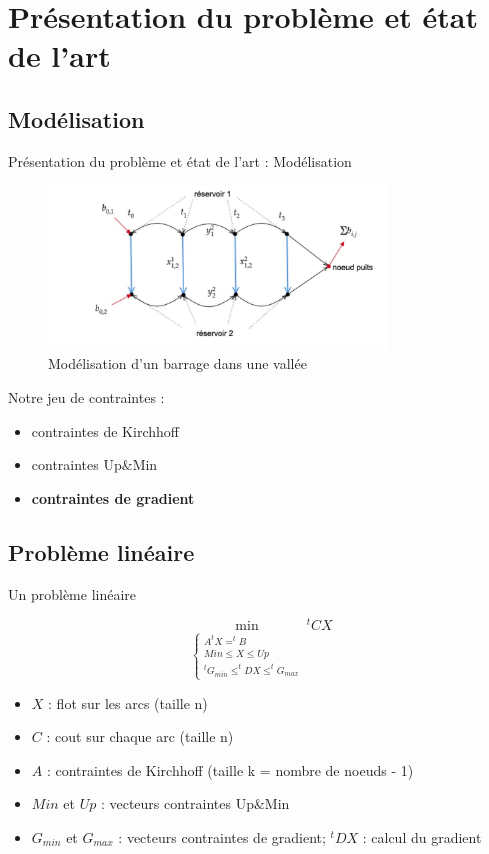 \documentclass{beamer}
\begin{document}
\section{Présentation du problème et état de l'art}
\subsection{Modélisation}
\begin{frame}{Présentation du problème et état de l'art : Modélisation}
\begin{figure}[h]
    \centering
    \includegraphics[width = 9cm]{barrageexemple.JPG}
    \caption{Modélisation d'un barrage dans une vallée}
    \label{fig:exemple}
\end{figure}
Notre jeu de contraintes : 
\begin{itemize}
    \item contraintes de Kirchhoff
    \item contraintes Up\&Min
    \item \textbf{contraintes de gradient}
\end{itemize}

\insertframenumber\end{frame}

\subsection{Problème linéaire}
\begin{frame}{Un problème linéaire}

$$
    \displaystyle \min_{ \left\{
    \begin{array}{ll}
         A ^t X = ^t B \\
          Min\leq X\leq Up\\
          ^t G_{min} \leq ^tD X \leq ^t G_{max} 
    \end{array}
    \right.
    }
    {^t C X}
$$
\begin{itemize}
    \item $X$ : flot sur les arcs (taille n)
    \item $C$ : cout sur chaque arc (taille n)
    \item $A$ : contraintes de Kirchhoff (taille k = nombre de noeuds - 1)
    \item $Min$ et $Up$ : vecteurs contraintes Up\&Min
    \item $G_{min}$ et $G_{max}$ : vecteurs contraintes de gradient; $^tDX$ : calcul du gradient
\end{itemize}
\insertframenumber\end{frame}
\end{document}
